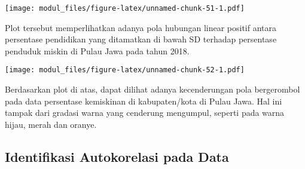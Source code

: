 \documentclass[
]{book}
\newenvironment{Shaded}{\begin{snugshade}}{\end{snugshade}}
\newcommand{\AttributeTok}[1]{\textcolor[rgb]{0.77,0.63,0.00}{#1}}
\newcommand{\DecValTok}[1]{\textcolor[rgb]{0.00,0.00,0.81}{#1}}
\newcommand{\FunctionTok}[1]{\textcolor[rgb]{0.00,0.00,0.00}{#1}}
\newcommand{\NormalTok}[1]{#1}
\newcommand{\OtherTok}[1]{\textcolor[rgb]{0.56,0.35,0.01}{#1}}
\newcommand{\SpecialCharTok}[1]{\textcolor[rgb]{0.00,0.00,0.00}{#1}}
\newcommand{\StringTok}[1]{\textcolor[rgb]{0.31,0.60,0.02}{#1}}
\begin{document}
\begin{Shaded}
\end{Shaded}

\texttt{[image: modul\_files/figure-latex/unnamed-chunk-51-1.pdf]}

Plot tersebut memperlihatkan adanya pola hubungan linear positif antara persentase pendidikan yang ditamatkan di bawah SD terhadap persentase penduduk miskin di Pulau Jawa pada tahun 2018.

\begin{Shaded}
\end{Shaded}

\texttt{[image: modul\_files/figure-latex/unnamed-chunk-52-1.pdf]}

Berdasarkan plot di atas, dapat dilihat adanya kecenderungan pola bergerombol pada data persentase kemiskinan di kabupaten/kota di Pulau Jawa. Hal ini tampak dari gradasi warna yang cenderung mengumpul, seperti pada warna hijau, merah dan oranye.

\hypertarget{identifikasi-autokorelasi-pada-data}{%
\subsection{Identifikasi Autokorelasi pada Data}\label{identifikasi-autokorelasi-pada-data}}
\end{document}
